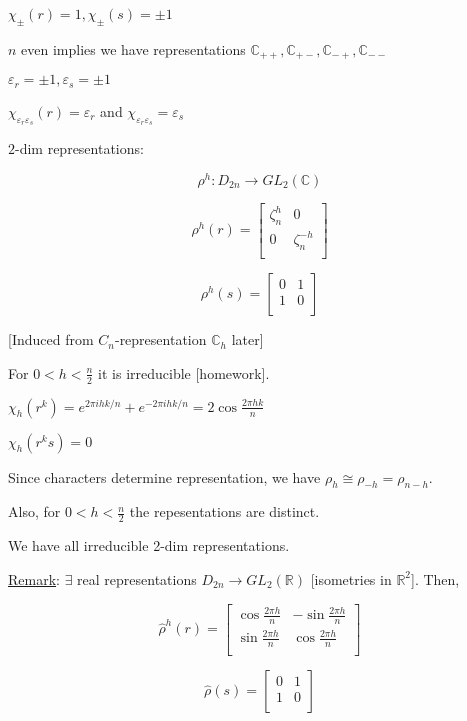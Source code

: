 \documentclass{article}
\theoremstyle{definition}
\begin{document}
\(\chi_{\pm}(r) = 1, \chi_{\pm}(s) = \pm 1\) 

\(n\) even implies we have representations \(\mathbb{C}_{++},\mathbb{C}_{+-},\mathbb{C}_{-+},\mathbb{C}_{--}\) 

\(\varepsilon _r = \pm 1, \varepsilon_s = \pm 1\)

\(\chi_{\varepsilon_r \varepsilon_s} (r) = \varepsilon_r\) and \(\chi_{\varepsilon_r \varepsilon_s} = \varepsilon_s\)

\(2\)-dim representations:

\[
    \rho^h : D_{2n} \to GL_2(\mathbb{C})
\]

\[
    \rho^h(r) = \begin{bmatrix}
        \zeta_n^h &  0 \\
        0 &  \zeta_n^{-h} \\
    \end{bmatrix}
\]

\[
    \rho^h(s) = \begin{bmatrix}
        0 &  1 \\
        1 &  0 \\
    \end{bmatrix}
\]

[Induced from \(C_n\)-representation \(\mathbb{C}_h\) later]

For \(0 < h < \frac{n}{2}\) it is irreducible [homework].

\(\chi_h(r^k) = e^{2 \pi i h k/ n} + e^{- 2 \pi i h k / n} = 2 \cos \frac{2\pi hk}{n}\) 

\(\chi_h(r^k s) = 0\) 

Since characters determine representation, we have \(\rho_h \cong \rho_{-h} = \rho_{n-h}\). 

Also, for \(0 < h < \frac{n}{2}\) the repesentations are distinct.

We have all irreducible 2-dim representations.

\underline{Remark}: \(\exists\) real representations \(D_{2n} \to GL_2(\mathbb{R})\) [isometries in \(\mathbb{R}^2\)]. Then,

\[
    \hat{\rho}^h (r) = \begin{bmatrix}
        \cos \frac{2\pi h}{n} &  - \sin \frac{2 \pi h}{n} \\
        \sin \frac{2 \pi h}{n} &  \cos \frac{2\pi h}{n} \\
    \end{bmatrix}
\]

\[
    \hat{\rho}(s) = \begin{bmatrix}
        0 &  1 \\
        1 &  0 \\
    \end{bmatrix}
\]
\end{document}
